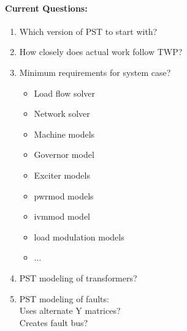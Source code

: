 \documentclass[12pt]{article}
\begin{document}
\begin{multicols}{2}
\paragraph{Current Questions:}
	\begin{enumerate}
	\itemsep0em 
\item Which version of PST to start with?
\item How closely does actual work follow TWP?
		\item Minimum requirements for system case?
\begin{minipage}{\linewidth}
\begin{multicols}{2}
		\begin{itemize}
\itemsep0em 
		\footnotesize
			\item Load flow solver
			\item Network solver
			\item Machine models
			\item Governor model
			\item Exciter models
			\item pwrmod models
			\item ivmmod model
			\item load modulation models
			\item ...
		\end{itemize}
\end{multicols}
\end{minipage}

		\item PST modeling of transformers?
		\item PST modeling of faults: \\
		Uses alternate Y matrices? \\
		Creates fault bus?
	\end{enumerate}



\vfill\null
\end{multicols}
\end{document}
